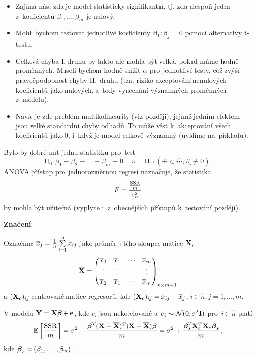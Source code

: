 \begin{itemize}
\item Zajímá nás, zda je model statisticky signifikantní, tj. zda alespoň jeden z~koeficientů $\beta_1,\dots, \beta_m$ je nulový.
\item Mohli bychom testovat jednotlivé koeficienty $\text{H}_0 : \beta_j = 0$ pomocí alternativy t-testu.
\item Celková chyba I. druhu by takto ale mohla být velká, pokud máme hodně proměnných. Museli bychom hodně snížit $\alpha$ pro~jednotlivé testy, což zvýší pravděpodobnost chyby II.~druhu (tzn. riziko akceptování nenulových koeficientů jako nulových, a~tedy vynechání významných proměnných z~modelu).
\item Navíc je zde problém multikolinearity (viz později), jejímž jedním efektem jsou velké standardní chyby odhadů. To může vést k~akceptování všech koeficientů jako 0, i~když je model celkově významný (uvidíme na~příkladu).
\end{itemize}

Bylo by dobré mít jednu statistiku pro~test
 $$
\text{H}_0 : \beta_1 = \beta_2 = ... = \beta_m = 0 \quad \times \quad \text{H}_1 : (\exists i\in \widehat{m}, \beta_i \neq 0).
 $$
ANOVA přístup pro~jednorozměrnou regresi naznačuje, že statistika
 $$
F = \frac{\frac{\mathrm{SSR}}{m}}{s_n^2}
 $$
by mohla být užitečná (vyplyne i~z~obecnějších přístupů k~testování později).

\textbf{Značení:}

Označíme $\overline{x}_j = \frac{1}{n} \sum\limits_{i=1}^{n} x_{ij}$ jako průměr j-tého sloupce matice $\mathbf{X}$,
 $$
	\overline{\mathbf{X}} = \begin{pmatrix}
	\overline{x}_0 & \overline{x}_1 & \cdots & \overline{x}_m \\
	\vdots & \vdots & & \vdots \\
	\overline{x}_0 & \overline{x}_1 & \cdots & \overline{x}_m
	\end{pmatrix}_{n \times m+1} 
 $$
 a $(\mathbf{X}_c)_{ij}$ centrované matice regresorů, kde $(\mathbf{X}_c)_{ij} = x_{ij} - \overline{x}_j$, $i\in\widehat{n}, j = 1,\dots, m$.

\begin{theorem}
	V modelu $\mathbf{Y} = \mathbf{X} \boldsymbol{\beta} + \mathbf{e}$, kde $e_i$ jsou nekorelované a~$e_i \sim \mathcal{N}(0,\sigma^2\textbf{I})$ pro~$i  \in\widehat{n} $ platí
	 $$
		\mathbb{E} \left[\frac{\mathrm{SSR}}{m} \right] = \sigma^2 + \frac{\boldsymbol{\beta}^T(\mathbf{X} - \overline{\mathbf{X}})^T(\mathbf{X} - \overline{\mathbf{X}}) \boldsymbol{\beta}}{m} = \sigma^2 + \frac{\boldsymbol{\beta}_s^T \mathbf{X}_c^T \mathbf{X}_c \boldsymbol{\beta}_s}{m},
	 $$
	kde $\boldsymbol{\beta}_s = (\beta_1,\dots, \beta_m)$.
\end{theorem}

